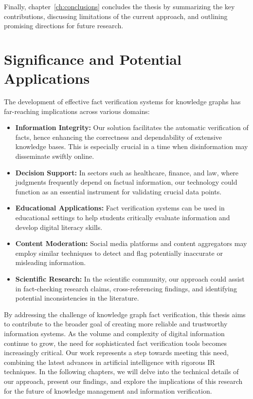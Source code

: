 Finally, chapter~\ref{ch:conclusions} concludes the thesis by summarizing the key contributions, discussing limitations of the current approach, and outlining promising directions for future research.

\section{Significance and Potential Applications}\label{sec:significance}
The development of effective fact verification systems for knowledge graphs has far-reaching implications across various domains:
\begin{itemize}
    \item \textbf{Information Integrity:} Our solution facilitates the automatic verification of facts, hence enhancing the correctness and dependability of extensive knowledge bases. This is especially crucial in a time when disinformation may disseminate swiftly online.
    \item \textbf{Decision Support:} In sectors such as healthcare, finance, and law, where judgments frequently depend on factual information, our technology could function as an essential instrument for validating crucial data points.
    \item \textbf{Educational Applications:} Fact verification systems can be used in educational settings to help students critically evaluate information and develop digital literacy skills.
    \item \textbf{Content Moderation:} Social media platforms and content aggregators may employ similar techniques to detect and flag potentially inaccurate or misleading information.
    \item \textbf{Scientific Research:} In the scientific community, our approach could assist in fact-checking research claims, cross-referencing findings, and identifying potential inconsistencies in the literature.
\end{itemize}

By addressing the challenge of knowledge graph fact verification, this thesis aims to contribute to the broader goal of creating more reliable and trustworthy information systems.
As the volume and complexity of digital information continue to grow, the need for sophisticated fact verification tools becomes increasingly critical.
Our work represents a step towards meeting this need, combining the latest advances in artificial intelligence with rigorous \ac{IR} techniques.
In the following chapters, we will delve into the technical details of our approach, present our findings, and explore the implications of this research for the future of knowledge management and information verification.